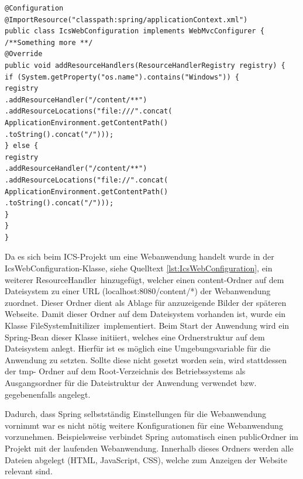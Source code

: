 \lstset{language=Java}
\begin{lstlisting}[caption={IcsWebConfiguration.java}, label={lst:IcsWebConfiguration}]
@Configuration
@ImportResource("classpath:spring/applicationContext.xml")
public class IcsWebConfiguration implements WebMvcConfigurer {
/**Something more **/
@Override
public void addResourceHandlers(ResourceHandlerRegistry registry) {
if (System.getProperty("os.name").contains("Windows")) {
registry
.addResourceHandler("/content/**")
.addResourceLocations("file:///".concat(
ApplicationEnvironment.getContentPath()
.toString().concat("/")));
} else {
registry
.addResourceHandler("/content/**")
.addResourceLocations("file://".concat(
ApplicationEnvironment.getContentPath()
.toString().concat("/")));
}
}
}
\end{lstlisting}

Da es sich beim \ac{ICS}-Projekt um eine Webanwendung handelt wurde in der \glqq IcsWebConfiguration\grqq -Klasse, siehe Quelltext \ref{lst:IcsWebConfiguration}, ein weiterer \glqq ResourceHandler\grqq \, hinzugefügt, welcher einen \glqq content\grqq-Ordner auf dem Dateisystem zu einer URL (\glqq localhost:8080/content/*\grqq) der Webanwendung zuordnet. Dieser Ordner dient als Ablage für anzuzeigende Bilder der späteren Webseite. Damit dieser Ordner auf dem Dateisystem vorhanden ist, wurde ein Klasse \glqq FileSystemInitilizer\grqq \, implementiert. Beim Start der Anwendung wird ein Spring-Bean dieser Klasse initiiert, welches eine Ordnerstruktur auf dem Dateisystem anlegt. Hierfür ist es möglich eine Umgebungsvariable für die Anwendung zu setzten. Sollte diese nicht gesetzt worden sein, wird stattdessen der \glqq tmp\grqq- Ordner auf dem Root-Verzeichnis des Betriebssystems als Ausgangsordner für die Dateistruktur der Anwendung verwendet bzw. gegebenenfalls angelegt.

Dadurch, dass Spring selbstständig Einstellungen für die Webanwendung vornimmt war es nicht nötig weitere Konfigurationen für eine Webanwendung vorzunehmen. Beispielsweise verbindet Spring automatisch einen \glqq public\grqq Ordner im Projekt mit der laufenden Webanwendung. Innerhalb dieses Ordners werden alle Dateien abgelegt (HTML, JavaScript, CSS), welche zum Anzeigen der Website relevant sind.

